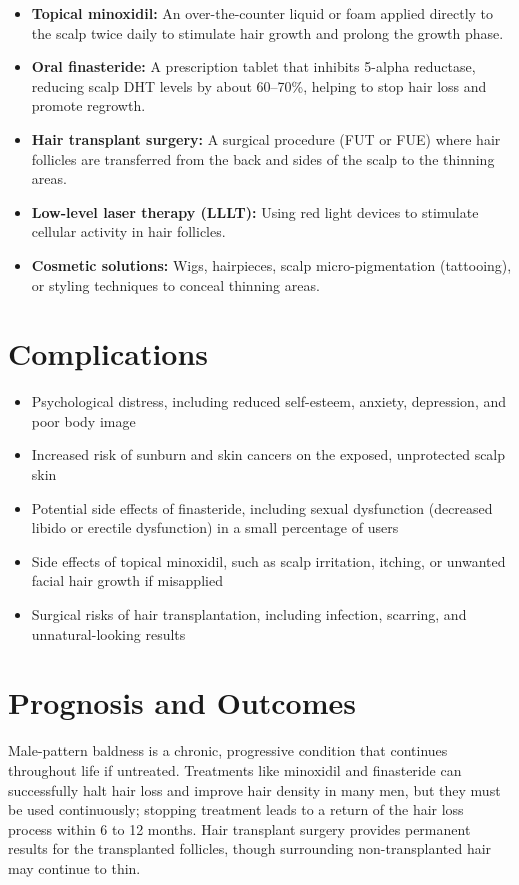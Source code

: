 \begin{itemize}
    \item \textbf{Topical minoxidil:} An over-the-counter liquid or foam applied directly to the scalp twice daily to stimulate hair growth and prolong the growth phase.
    \item \textbf{Oral finasteride:} A prescription tablet that inhibits 5-alpha reductase, reducing scalp DHT levels by about 60--70\%, helping to stop hair loss and promote regrowth.
    \item \textbf{Hair transplant surgery:} A surgical procedure (FUT or FUE) where hair follicles are transferred from the back and sides of the scalp to the thinning areas.
    \item \textbf{Low-level laser therapy (LLLT):} Using red light devices to stimulate cellular activity in hair follicles.
    \item \textbf{Cosmetic solutions:} Wigs, hairpieces, scalp micro-pigmentation (tattooing), or styling techniques to conceal thinning areas.
\end{itemize}

\section*{Complications}
\begin{itemize}
    \item Psychological distress, including reduced self-esteem, anxiety, depression, and poor body image
    \item Increased risk of sunburn and skin cancers on the exposed, unprotected scalp skin
    \item Potential side effects of finasteride, including sexual dysfunction (decreased libido or erectile dysfunction) in a small percentage of users
    \item Side effects of topical minoxidil, such as scalp irritation, itching, or unwanted facial hair growth if misapplied
    \item Surgical risks of hair transplantation, including infection, scarring, and unnatural-looking results
\end{itemize}

\section*{Prognosis and Outcomes}
Male-pattern baldness is a chronic, progressive condition that continues throughout life if untreated. Treatments like minoxidil and finasteride can successfully halt hair loss and improve hair density in many men, but they must be used continuously; stopping treatment leads to a return of the hair loss process within 6 to 12 months. Hair transplant surgery provides permanent results for the transplanted follicles, though surrounding non-transplanted hair may continue to thin.

